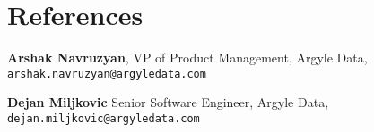 

\section{\sc   References}

\begin{list1}
\item {\bf Arshak Navruzyan}, VP of Product Management, Argyle Data, \\
 \texttt{arshak.navruzyan@argyledata.com}

\item {\bf Dejan Miljkovic}  Senior Software Engineer, Argyle Data,\\
 \texttt{dejan.miljkovic@argyledata.com} 
 
\end{list1}